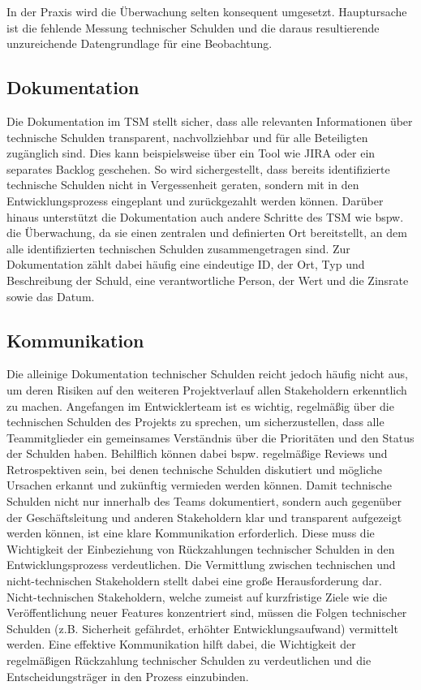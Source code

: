 \documentclass[acmtog]{acmart}
\begin{document}
In der Praxis wird die Überwachung selten konsequent umgesetzt. Hauptursache
ist die fehlende Messung technischer Schulden und die daraus resultierende
unzureichende Datengrundlage für eine Beobachtung. \cite{Ylihuumo16}

\subsection{Dokumentation}\label{sec:TSM_Dokumentation}
Die Dokumentation im TSM stellt sicher, dass alle relevanten Informationen über
technische Schulden transparent, nachvollziehbar und für alle Beteiligten
zugänglich sind. Dies kann beispielsweise über ein Tool wie JIRA oder ein
separates Backlog geschehen. So wird sichergestellt, dass bereits identifizierte
technische Schulden nicht in Vergessenheit geraten, sondern mit in den
Entwicklungsprozess eingeplant und zurückgezahlt werden können. Darüber hinaus
unterstützt die Dokumentation auch andere Schritte des TSM wie bspw. die
Überwachung, da sie einen zentralen und definierten Ort bereitstellt,
an dem alle identifizierten technischen Schulden zusammengetragen sind.
Zur Dokumentation zählt dabei häufig eine eindeutige ID, der Ort, Typ
und Beschreibung der Schuld, eine verantwortliche Person, der Wert und
die Zinsrate sowie das Datum.

\subsection{Kommunikation}\label{sec:TSM_Kommunikation}
Die alleinige Dokumentation technischer Schulden reicht jedoch häufig nicht
aus, um deren Risiken auf den weiteren Projektverlauf allen Stakeholdern
erkenntlich zu machen. Angefangen im Entwicklerteam ist es wichtig,
regelmäßig über die technischen Schulden des Projekts zu sprechen,
um sicherzustellen, dass alle Teammitglieder ein gemeinsames Verständnis
über die Prioritäten und den Status der Schulden haben. Behilflich können
dabei bspw. regelmäßige Reviews und Retrospektiven sein, bei denen technische
Schulden diskutiert und mögliche Ursachen erkannt und zukünftig vermieden werden können.
Damit technische Schulden nicht nur innerhalb des Teams dokumentiert, sondern auch
gegenüber der Geschäftsleitung und anderen Stakeholdern klar und transparent aufgezeigt
werden können, ist eine klare Kommunikation erforderlich. Diese muss die Wichtigkeit
der Einbeziehung von Rückzahlungen technischer Schulden in den Entwicklungsprozess
verdeutlichen. Die Vermittlung zwischen technischen und nicht-technischen Stakeholdern
stellt dabei eine große Herausforderung dar. Nicht-technischen Stakeholdern,
welche zumeist auf kurzfristige Ziele wie die Veröffentlichung neuer Features
konzentriert sind, müssen die Folgen technischer Schulden (z.B. Sicherheit gefährdet,
erhöhter Entwicklungsaufwand) vermittelt werden. Eine effektive Kommunikation hilft
dabei, die Wichtigkeit der regelmäßigen Rückzahlung technischer Schulden zu verdeutlichen
und die Entscheidungsträger in den Prozess einzubinden. \cite{Ylihuumo16, Alves16}
\end{document}
